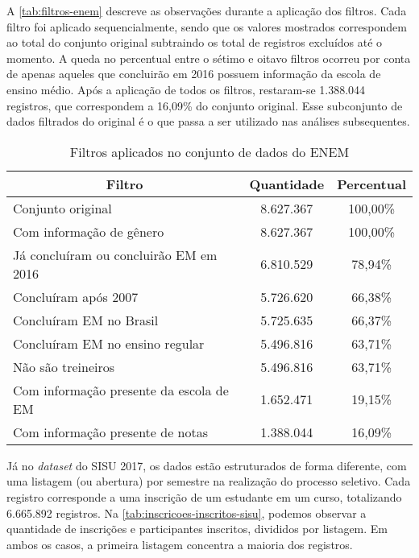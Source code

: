 A \autoref{tab:filtros-enem} descreve as observações durante a aplicação dos filtros. Cada filtro foi aplicado sequencialmente, sendo que os valores mostrados correspondem ao total do conjunto original subtraindo os total de registros excluídos até o momento. A queda no percentual entre o sétimo e oitavo filtros ocorreu por conta de apenas aqueles que concluirão em 2016 possuem informação da escola de ensino médio. Após a aplicação de todos os filtros, restaram-se 1.388.044 registros, que correspondem a 16,09\% do conjunto original. Esse subconjunto de dados filtrados do original é o que passa a ser utilizado nas análises subsequentes.

\begin{table}[h]
  \begin{tabular}{lcc}
  \hline
  \multicolumn{1}{c}{\textbf{Filtro}}     & \textbf{Quantidade} & \textbf{Percentual} \\ \hline
  Conjunto original                       & 8.627.367             & 100,00\%            \\ \hline
  Com informação de gênero                & 8.627.367             & 100,00\%            \\ \hline
  Já concluíram ou concluirão EM em 2016  & 6.810.529             & 78,94\%             \\ \hline
  Concluíram após 2007                    & 5.726.620             & 66,38\%             \\ \hline
  Concluíram EM no Brasil                 & 5.725.635             & 66,37\%             \\ \hline
  Concluíram EM no ensino regular         & 5.496.816             & 63,71\%             \\ \hline
  Não são treineiros                      & 5.496.816             & 63,71\%             \\ \hline
  Com informação presente da escola de EM & 1.652.471             & 19,15\%             \\ \hline
  Com informação presente de notas        & 1.388.044             & 16,09\%             \\ \hline
  \end{tabular}
  \caption{Filtros aplicados no conjunto de dados do ENEM}
  \label{tab:filtros-enem}
  \end{table}

Já no \textit{dataset} do SISU 2017, os dados estão estruturados de forma diferente, com uma listagem (ou abertura) por semestre na realização do processo seletivo. Cada registro corresponde a uma inscrição de um estudante em um curso, totalizando 6.665.892 registros. Na \autoref{tab:inscricoes-inscritos-sisu}, podemos observar a quantidade de inscrições e participantes inscritos, divididos por listagem. Em ambos os casos, a primeira listagem concentra a maioria dos registros.

